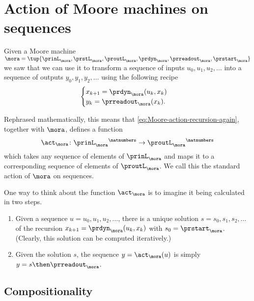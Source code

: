 
\section{Action of Moore machines on sequences}
\label{sec:Moore-acting-on-sequences}

Given a Moore machine $\mora = \tup{\prinL_\mora,\prstL_\mora,\proutL_\mora,\prdyn_\mora,\prreadout_\mora,\prstart_\mora}$
we saw that we can use it to transform a sequence of inputs $u_0, u_1, u_2, \dots$ into a sequence of outputs $y_0, y_1, y_2, \dots$ using the following recipe
\begin{equation}
    \label{eq:Moore-action-recursion-again}
    \begin{cases}
        x_{k+1} = \prdyn_\mora(u_k, x_k) \\
        y_{k}   = \prreadout_\mora(x_{k}).
    \end{cases}
\end{equation}

Rephrased mathematically, this means that \cref{eq:Moore-action-recursion-again}, together with $\mora$, defines a function
\begin{equation*}
\act_{\mora} \colon {\prinL_\mora}^\natnumbers \to {\proutL_\mora}^\natnumbers
\end{equation*}
which takes any sequence  of elements of $\prinL_\mora$ and maps it to a corresponding sequence  of elements of $\proutL_\mora$.  We call this the standard action of $\mora$ on sequences.


\begin{remark}
    \label{re:moore-action-two-steps}
    One way to think about the function $\act_{\mora}$ is to imagine it being calculated in two steps.
    \begin{enumerate}
        \item Given a sequence $u = u_0, u_1, u_2, \dots$, there is a unique solution $s = s_0, s_1, s_2, \dots$ of the recursion $x_{k+1} = \prdyn_\mora(u_k, x_k)$ with $s_0 = \prstart_\mora$. (Clearly, this solution can be computed iteratively.)
        \item Given the solution $s$, the sequence $y = \act_{\mora}(u)$ is simply $y = s \then \prreadout_\mora$.
    \end{enumerate}
\end{remark}

\subsection{Compositionality}

